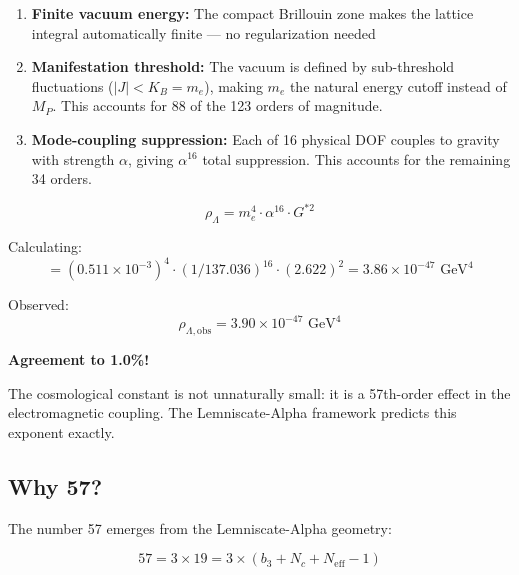 \documentclass[
  11pt,
  letterpaper,
  twoside,
  openright]{book}
\providecommand{\tightlist}{%
  \setlength{\itemsep}{0pt}\setlength{\parskip}{0pt}}
\begin{document}
\begin{enumerate}
\def\labelenumi{\arabic{enumi}.}
\tightlist
\item
  \textbf{Finite vacuum energy:} The compact Brillouin zone makes the
  lattice integral automatically finite --- no regularization needed
\item
  \textbf{Manifestation threshold:} The vacuum is defined by
  sub-threshold fluctuations (\(|J| < K_B = m_e\)), making \(m_e\) the
  natural energy cutoff instead of \(M_P\). This accounts for 88 of the
  123 orders of magnitude.
\item
  \textbf{Mode-coupling suppression:} Each of 16 physical DOF couples to
  gravity with strength \(\alpha\), giving \(\alpha^{16}\) total
  suppression. This accounts for the remaining 34 orders.
\end{enumerate}

\[\rho_\Lambda = m_e^4 \cdot \alpha^{16} \cdot G^{*2}\]

Calculating:
\[= (0.511 \times 10^{-3})^4 \cdot (1/137.036)^{16} \cdot (2.622)^2 = 3.86 \times 10^{-47} \text{ GeV}^4\]

Observed:
\[\rho_{\Lambda,\text{obs}} = 3.90 \times 10^{-47} \text{ GeV}^4\]

\textbf{Agreement to 1.0\%!}

\begin{tcolorbox}[enhanced jigsaw, leftrule=.75mm, title=\textcolor{quarto-callout-important-color}{\faExclamation}\hspace{0.5em}{The 122 Orders of Magnitude Explained}, bottomrule=.15mm, opacityback=0, coltitle=black, arc=.35mm, colframe=quarto-callout-important-color-frame, colbacktitle=quarto-callout-important-color!10!white, colback=white, titlerule=0mm, breakable, bottomtitle=1mm, toptitle=1mm, rightrule=.15mm, toprule=.15mm, left=2mm, opacitybacktitle=0.6]

The cosmological constant is not unnaturally small: it is a 57th-order
effect in the electromagnetic coupling. The Lemniscate-Alpha framework
predicts this exponent exactly.

\end{tcolorbox}

\subsection{Why 57?}\label{why-57}

The number 57 emerges from the Lemniscate-Alpha geometry:

\[57 = 3 \times 19 = 3 \times (b_3 + N_c + N_{\text{eff}} - 1)\]
\end{document}
